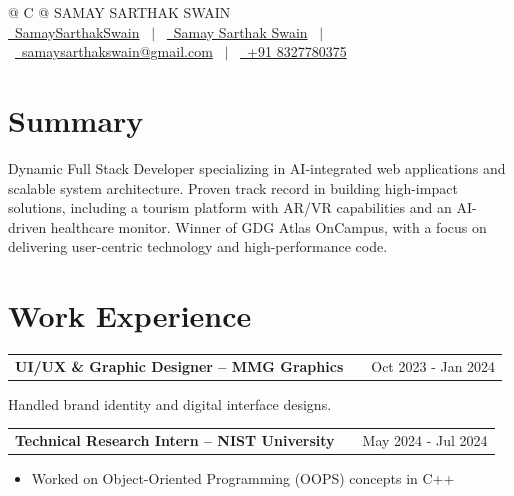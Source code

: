 \documentclass[a4paper,12pt]{article}
\makeatletter
\newenvironment{jobshort}[2]
    {
    \begin{tabularx}{\linewidth}{@{}l X r@{}}
    \textbf{#1} & \hfill &  #2 \\[3.75pt]
    \end{tabularx}
    }
    {
    }
\newenvironment{joblong}[2]
    {
    \begin{tabularx}{\linewidth}{@{}l X r@{}}
    \textbf{#1} & \hfill &  #2 \\[3.75pt]
    \end{tabularx}
    \begin{minipage}[t]{\linewidth}
    \begin{itemize}[nosep,after=\strut, leftmargin=1em, itemsep=3pt,label=--]
    }
    {
    \end{itemize}
    \end{minipage}    
    }
\makeatother
\begin{document}
\pagestyle{empty} 


\begin{tabularx}{\linewidth}{@{} C @{}}
\Huge{SAMAY SARTHAK SWAIN} \\[7.5pt]

\href{https://github.com/SamaySarthakSwain}{\raisebox{-0.05\height}\faGithub\ SamaySarthakSwain} \ $|$ \ 
\href{https://www.linkedin.com/in/samay-sarthak-swain-b9a277330}{\raisebox{-0.05\height}\faLinkedin\ Samay Sarthak Swain} \ $|$ \ 
\href{mailto:samaysarthakswain@gmail.com}{\raisebox{-0.05\height}\faEnvelope \ samaysarthakswain@gmail.com} \ $|$ \ 
\href{tel:+918327780375}{\raisebox{-0.05\height}\faMobile \ +91 8327780375} \\

\end{tabularx}


\section{Summary}
Dynamic Full Stack Developer specializing in AI-integrated web applications and scalable system architecture. Proven track record in building high-impact solutions, including a tourism platform with AR/VR capabilities and an AI-driven healthcare monitor. Winner of GDG Atlas OnCampus, with a focus on delivering user-centric technology and high-performance code.


\section{Work Experience}

\begin{jobshort}{UI/UX \& Graphic Designer -- MMG Graphics}{Oct 2023 - Jan 2024}
Handled brand identity and digital interface designs.
\end{jobshort}

\begin{joblong}{Technical Research Intern -- NIST University}{May 2024 - Jul 2024}
\item Worked on Object-Oriented Programming (OOPS) concepts in C++
\end{joblong}
\end{document}
